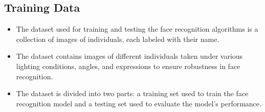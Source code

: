 \documentclass[openany]{report}
\begin{document}
\subsection{Training Data}
\begin{itemize}
    \item The dataset used for training and testing the face recognition algorithms is a collection of images of individuals, each labeled with their name.
    \item The dataset contains images of different individuals taken under various lighting conditions, angles, and expressions to ensure robustness in face recognition.
    \item The dataset is divided into two parts: a training set used to train the face recognition model and a testing set used to evaluate the model's performance.
\end{itemize}
\end{document}
